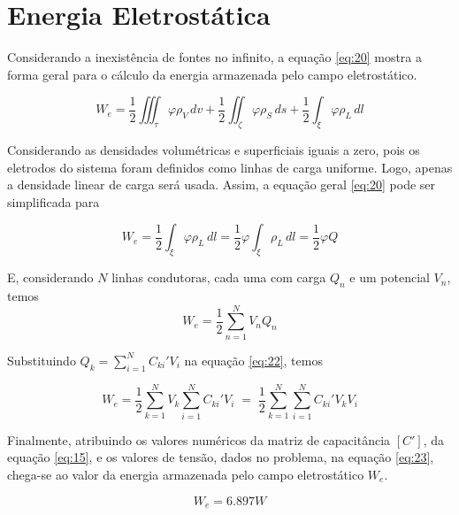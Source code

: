 \documentclass{aleph-revista}
\begin{document}
\section{Energia Eletrostática}

Considerando a inexistência de fontes no infinito, a equação \eqref{eq:20} mostra a forma geral para o cálculo da energia armazenada pelo campo eletrostático.

\begin{equation}\label{eq:20}
  W_e = \frac{1}{2}\iiint_\tau \varphi \rho_V\, dv + \frac{1}{2}\iint_\zeta \varphi \rho_S\, ds + \frac{1}{2}\int_\xi \varphi \rho_L\, dl
\end{equation}

Considerando as densidades volumétricas e superficiais iguais a zero, pois os eletrodos do sistema foram definidos como linhas de carga uniforme. Logo, apenas a densidade linear de carga será usada. Assim, a equação geral \eqref{eq:20} pode ser simplificada para

\begin{equation}\label{eq:21}
  W_e = \frac{1}{2}\int_\xi \varphi \rho_L\, dl = \frac{1}{2}\varphi \int_\xi \rho_L\, dl = \frac{1}{2}\varphi Q
\end{equation}

E, considerando $N$ linhas condutoras, cada uma com carga $Q_n$ e um potencial $V_n$, temos
\begin{equation}\label{eq:22}
  W_e = \frac{1}{2} \sum_{n=1}^N V_nQ_n
\end{equation}

Substituindo $\displaystyle Q_k=\sum_{i=1}^N C_{ki}'V_i$ na equação \eqref{eq:22}, temos

\begin{equation}\label{eq:23}
  W_e = \frac{1}{2} \sum_{k=1}^N V_k \sum_{i=1}^N C_{ki}'V_i \; = \; \frac{1}{2} \sum_{k=1}^N \sum_{i=1}^N C_{ki}'V_kV_i
\end{equation}

Finalmente, atribuindo os valores numéricos da matriz de capacitância $[C']$, da equação \eqref{eq:15}, e os valores de tensão, dados no problema, na equação \eqref{eq:23}, chega-se ao valor da energia armazenada pelo campo eletrostático $W_e$.

\begin{equation}\label{eq:24}
  W_e = 6.897 W
\end{equation}
\end{document}
